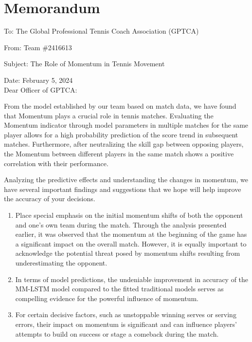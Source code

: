 \newpage
\section{Memorandum}


\noindent To: The Global Professional Tennis Coach Association (GPTCA)

\noindent From: Team \#2416613 

\noindent Subject:  The Role of Momentum in Tennis Movement

\noindent Date: February 5, 2024 
\\

 \noindent Dear Officer of GPTCA:

From the model established by our team based on match data, we have found that Momentum plays a crucial role in tennis matches. Evaluating the Momentum indicator through model parameters in multiple matches for the same player allows for a high probability prediction of the score trend in subsequent matches. Furthermore, after neutralizing the skill gap between opposing players, the Momentum between different players in the same match shows a positive correlation with their performance.

Analyzing the predictive effects and understanding the changes in momentum, we have several important findings and suggestions that we hope will help improve the accuracy of your decisions.

\begin{enumerate}
\item Place special emphasis on the initial momentum shifts of both the opponent and one's own team during the match. Through the analysis presented earlier, it was observed that the momentum at the beginning of the game has a significant impact on the overall match. However, it is equally important to acknowledge the potential threat posed by momentum shifts resulting from underestimating the opponent.

\item In terms of model predictions, the undeniable improvement in accuracy of the MM-LSTM model compared to the fitted traditional models serves as compelling evidence for the powerful influence of momentum.

\item  For certain decisive factors, such as unstoppable winning serves or serving errors, their impact on momentum is significant and can influence players' attempts to build on success or stage a comeback during the match.
\end{enumerate}

